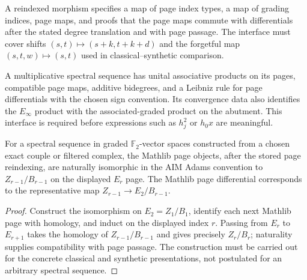 \begin{definition}
  \label{def:reindexed-ss-morphism}
  \notready
  A reindexed morphism specifies a map of page index types, a map of grading
  indices, page maps, and proofs that the page maps commute with differentials
  after the stated degree translation and with page passage.  The interface
  must cover shifts $(s,t)\mapsto(s+k,t+k+d)$ and the forgetful map
  $(s,t,w)\mapsto(s,t)$ used in classical--synthetic comparison.
\end{definition}

\begin{definition}
  \label{def:multiplicative-ss}
  \notready
  A multiplicative spectral sequence has unital associative products on its
  pages, compatible page maps, additive bidegrees, and a Leibniz rule for page
  differentials with the chosen sign convention.  Its convergence data also
  identifies the $E_\infty$ product with the associated-graded product on the
  abutment.  This interface is required before expressions such as $h_j^2$ or
  $h_0x$ are meaningful.
\end{definition}

\begin{proposition}
  \label{prop:categorical-elementwise-comparison}
  \notready
  For a spectral sequence in graded $\mathbb F_2$-vector spaces constructed
  from a chosen exact couple or filtered complex, the Mathlib page objects,
  after the stored page reindexing, are naturally isomorphic in the AIM Adams
  convention to $Z_{r-1}/B_{r-1}$ on the displayed $E_r$ page.  The Mathlib
  page differential corresponds to the representative map
  $Z_{r-1}\to E_2/B_{r-1}$.
\end{proposition}

\begin{proof}
  Construct the isomorphism on $E_2=Z_1/B_1$, identify each next Mathlib page
  with homology, and induct on the displayed index $r$.  Passing from $E_r$ to
  $E_{r+1}$ takes the homology of
  $Z_{r-1}/B_{r-1}$ and gives precisely $Z_r/B_r$; naturality supplies
  compatibility with page passage.  The construction must be carried
  out for the concrete classical and synthetic presentations, not postulated
  for an arbitrary spectral sequence.
\end{proof}

